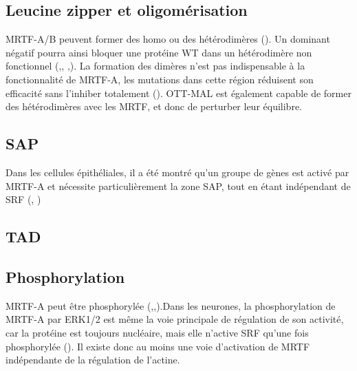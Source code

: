 \documentclass{report}
\begin{document}
 \subsection{Leucine zipper et oligomérisation}
 MRTF-A/B peuvent former des homo ou des hétérodimères (\cite{miralles_actin_2003}). Un dominant négatif pourra ainsi bloquer une protéine WT dans un hétérodimère non fonctionnel (\cite{selvaraj_megakaryoblastic_2003},\cite{cen_myocardin/mkl_2004}, \cite{li_requirement_2005},\cite{rajakyla_actin-regulated_2010}). La formation des dimères n'est pas indispensable à la fonctionnalité de MRTF-A, les mutations dans cette région réduisent son efficacité sans l'inhiber totalement (\cite{selvaraj_megakaryoblastic_2003}). 
 OTT-MAL est également capable de former des hétérodimères avec les MRTF, et donc de perturber leur équilibre. 
 
 \subsection{SAP}
 
Dans les cellules épithéliales, il a été montré qu'un groupe de gènes est activé par MRTF-A et nécessite particulièrement la zone SAP, tout en étant indépendant de SRF (\cite{asparuhova_transcriptional_2011}, \cite{gurbuz_sap_2014}) 
 
 
 \subsection{TAD}
 
 
 
 \subsection{Phosphorylation}
	MRTF-A peut être phosphorylée (\cite{miralles_actin_2003},\cite{cen_myocardin/mkl_2004},).Dans les neurones, la phosphorylation de MRTF-A par ERK1/2 est même la voie principale de régulation de son activité, car la protéine est toujours nucléaire, mais elle n'active SRF qu'une fois phosphorylée (\cite{kalita_role_2006}). Il existe donc au moins une voie d'activation de MRTF indépendante de la régulation de l'actine. 
	
\end{document}
